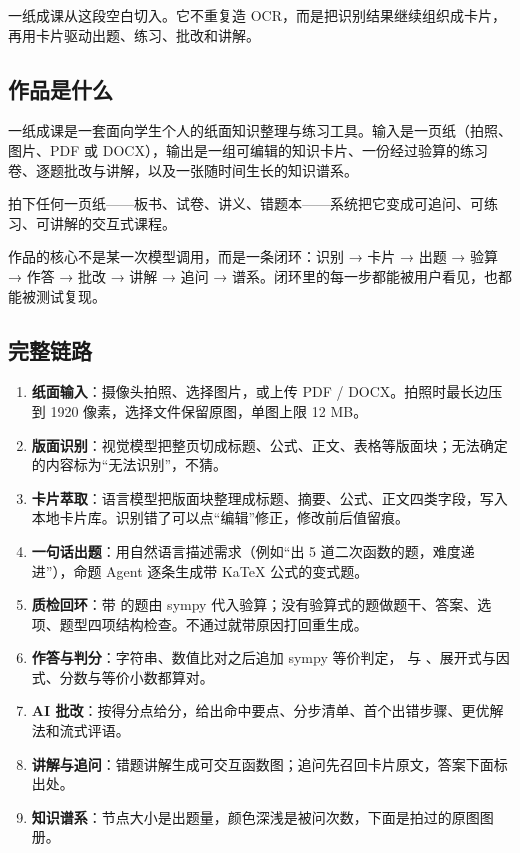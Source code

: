 \documentclass[11pt,a4paper,fontset=windows]{ctexart}
\newcommand{\env}[1]{\texttt{\detokenize{#1}}}
\begin{document}
一纸成课从这段空白切入。它不重复造 OCR，而是把识别结果继续组织成卡片，再用卡片驱动出题、练习、批改和讲解。

\subsection{作品是什么}

一纸成课是一套面向学生个人的纸面知识整理与练习工具。输入是一页纸（拍照、图片、PDF 或 DOCX），输出是一组可编辑的知识卡片、一份经过验算的练习卷、逐题批改与讲解，以及一张随时间生长的知识谱系。

\begin{keybox}[一句话概括]
拍下任何一页纸——板书、试卷、讲义、错题本——系统把它变成可追问、可练习、可讲解的交互式课程。
\end{keybox}

作品的核心不是某一次模型调用，而是一条闭环：识别 → 卡片 → 出题 → 验算 → 作答 → 批改 → 讲解 → 追问 → 谱系。闭环里的每一步都能被用户看见，也都能被测试复现。

\subsection{完整链路}

\begin{enumerate}
  \item \textbf{纸面输入}：摄像头拍照、选择图片，或上传 PDF / DOCX。拍照时最长边压到 1920 像素，选择文件保留原图，单图上限 12 MB。
  \item \textbf{版面识别}：视觉模型把整页切成标题、公式、正文、表格等版面块；无法确定的内容标为“无法识别”，不猜。
  \item \textbf{卡片萃取}：语言模型把版面块整理成标题、摘要、公式、正文四类字段，写入本地卡片库。识别错了可以点“编辑”修正，修改前后值留痕。
  \item \textbf{一句话出题}：用自然语言描述需求（例如“出 5 道二次函数的题，难度递进”），命题 Agent 逐条生成带 KaTeX 公式的变式题。
  \item \textbf{质检回环}：带 \env{verify} 的题由 sympy 代入验算；没有验算式的题做题干、答案、选项、题型四项结构检查。不通过就带原因打回重生成。
  \item \textbf{作答与判分}：字符串、数值比对之后追加 sympy 等价判定，\env{2=x} 与 \env{x=2}、展开式与因式、分数与等价小数都算对。
  \item \textbf{AI 批改}：按得分点给分，给出命中要点、分步清单、首个出错步骤、更优解法和流式评语。
  \item \textbf{讲解与追问}：错题讲解生成可交互函数图；追问先召回卡片原文，答案下面标出处。
  \item \textbf{知识谱系}：节点大小是出题量，颜色深浅是被问次数，下面是拍过的原图图册。
\end{enumerate}
\end{document}
